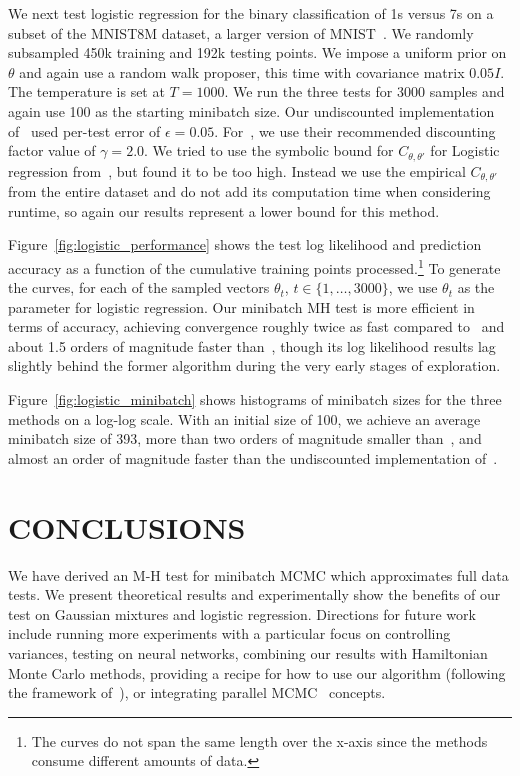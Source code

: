 \documentclass{article}
\begin{document}
We next test logistic regression for the binary classification of 1s
versus 7s on a subset of the MNIST8M dataset, a larger version of
MNIST~\cite{lecun-mnisthandwrittendigit-2010}. We randomly subsampled
450k training and 192k testing points.
We impose a uniform prior on $\theta$ and again use a random walk
proposer, this time with covariance matrix $0.05I$. The temperature is
set at $T=1000$. We run the three tests for 3000 samples and again use 100
as the starting minibatch size. Our undiscounted implementation of~\cite{cutting_mh_2014} used
per-test error of $\epsilon=0.05$.  For~\cite{icml2014c1_bardenet14},
we use their recommended discounting factor value of $\gamma=2.0$. We tried to use the
symbolic bound for $C_{\theta,\theta'}$ for Logistic regression
from~\cite{icml2014c1_bardenet14}, but found it to be too high. Instead we use
the empirical $C_{\theta,\theta'}$ from the entire dataset and do not add its
computation time when considering runtime, so again our results represent a
lower bound for this method.

Figure~\ref{fig:logistic_performance} shows the test log likelihood and
prediction accuracy as a function of the cumulative training points
processed.\footnote{The curves do not span the same length over the x-axis since
the methods consume different amounts of data.} To generate the curves, for each
of the sampled vectors $\theta_t$, $t\in\{1,\ldots,3000\}$, we use $\theta_t$ as
the parameter for logistic regression.  Our minibatch MH test is more efficient
in terms of accuracy, achieving convergence roughly twice as fast compared
to~\cite{cutting_mh_2014} and about 1.5 orders of magnitude faster
than~\cite{icml2014c1_bardenet14}, though its log likelihood results lag
slightly behind the former algorithm during the very early stages of
exploration.

Figure~\ref{fig:logistic_minibatch} shows histograms of minibatch sizes for the
three methods on a log-log scale. With an initial size of 100, we achieve an
average minibatch size of 393, more than two orders of magnitude smaller
than~\cite{icml2014c1_bardenet14}, and almost an order of magnitude faster than the
undiscounted implementation of~\cite{cutting_mh_2014}.



\section{CONCLUSIONS}\label{sec:conclusion}

We have derived an M-H test for minibatch MCMC which approximates full data
tests. We present theoretical results and experimentally show the benefits of
our test on Gaussian mixtures and logistic regression. Directions for future
work include running more experiments with a particular focus on controlling
variances, testing on neural networks, combining our results with Hamiltonian
Monte Carlo methods, providing a recipe for how to use our algorithm (following
the framework of~\cite{sgmcmc_2015}), or integrating parallel
MCMC~\cite{conf/uai/AngelinoKWSA14,conf/icml/AhnSW14} concepts.
\end{document}
